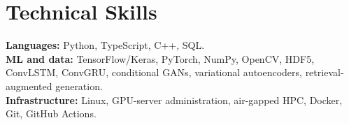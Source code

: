 \section{Technical Skills}
\textbf{Languages:} Python, TypeScript, C++, SQL.\\
\textbf{ML and data:} TensorFlow/Keras, PyTorch, NumPy, OpenCV, HDF5, ConvLSTM, ConvGRU, conditional GANs, variational autoencoders, retrieval-augmented generation.\\
\textbf{Infrastructure:} Linux, GPU-server administration, air-gapped HPC, Docker, Git, GitHub Actions.

